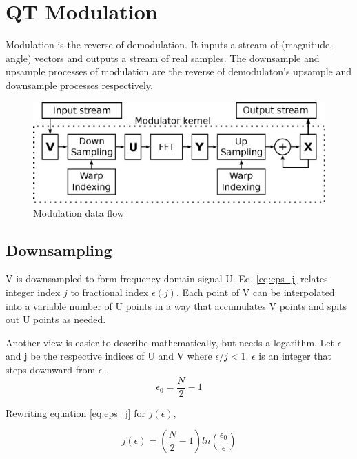 \section{QT Modulation}

Modulation is the reverse of demodulation.
It inputs a stream of (magnitude, angle) vectors and outputs a stream of real
samples. The downsample and upsample processes of modulation are the reverse
of demodulaton's upsample and downsample processes respectively.

\begin{figure}
	\centering
	\includegraphics[width=0.95\linewidth]{../source/mod_e}
	\caption[Relative to Quantum Time Demodulation]{Modulation data flow}
	\label{fig:mod}
\end{figure}

\subsection{Downsampling}

V is downsampled to form frequency-domain signal U.
Eq. \ref{eq:eps_j} relates integer index $j$ to fractional index $\epsilon(j)$.
Each point of V can be interpolated into a variable number of U points in a way
that accumulates V points and spits out U points as needed.

Another view is easier to describe mathematically, but needs a logarithm. Let
$\epsilon$ and j be the respective indices of U and V where $\epsilon/j < 1$.
$\epsilon$ is an integer that steps downward from $\epsilon_0$.
\begin{equation}
\epsilon_0 = \frac{N}{2} - 1
\end{equation}

Rewriting equation \ref{eq:eps_j} for $j(\epsilon)$,

\begin{equation}  \label{eq:j_eps}
j(\epsilon) = \left(\frac{N}{2}-1\right)
ln\left(\frac{\epsilon_0}{\epsilon}\right)
\end{equation}

